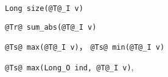 
\begin{issues}
\issueDraft
\end{issues}

\verb|Long size(@T@_I v)|

\verb|@Tr@ sum_abs(@T@_I v)|

\verb|@Ts@ max(@T@_I v)|， \verb|@Ts@ min(@T@_I v)|

\verb|@Ts@ max(Long_O ind, @T@_I v)|,